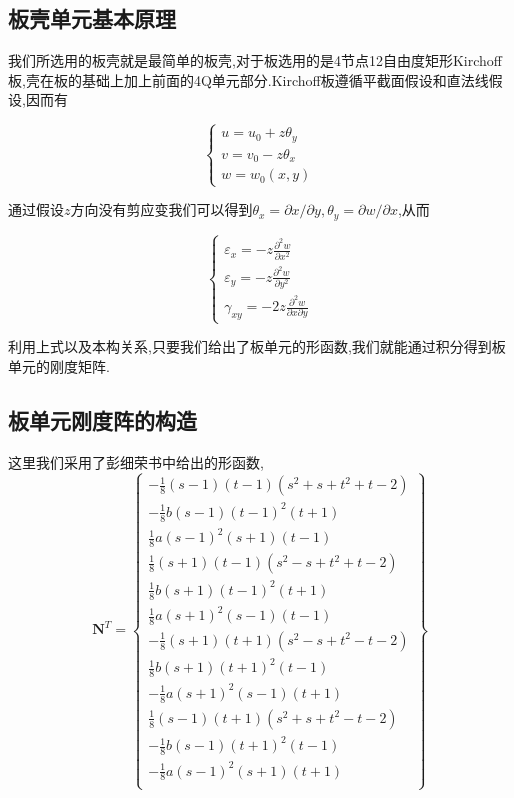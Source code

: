 
\subsection{板壳单元基本原理}
我们所选用的板壳就是最简单的板壳,对于板选用的是4节点12自由度矩形Kirchoff板,壳在板的基础上加上前面的4Q单元部分.Kirchoff板遵循平截面假设和直法线假设,因而有

\[
\left\{ \begin{gathered}
u=u_0+z\theta_y \\
v=v_0-z\theta_x \\
w=w_0(x,y)
\end{gathered} \right.
\]

通过假设$z$方向没有剪应变我们可以得到$\theta_x=\partial x/\partial y, \theta_y=\partial w/\partial x$,从而

\[
\left\{ \begin{gathered}
\varepsilon_x = -z\frac{\partial^2 w}{\partial x^2} \\
\varepsilon_y = -z\frac{\partial^2 w}{\partial y^2} \\
\gamma_{xy} = -2z\frac{\partial^2 w}{\partial x \partial y}
\end{gathered} \right.
\]
\par 利用上式以及本构关系,只要我们给出了板单元的形函数,我们就能通过积分得到板单元的刚度矩阵.
\subsection{板单元刚度阵的构造}
\par 这里我们采用了彭细荣书中给出的形函数,
\[ \mathbf{N}^T=\left\{
\begin{array}{c}
-\frac{1}{8}(s-1)(t-1)(s^2+s+t^2+t-2)\\ -\frac{1}{8}b(s-1)(t-1)^2(t+1)\\ \frac{1}{8}a(s-1)^2(s+1)(t-1) \\
\frac{1}{8}(s+1)(t-1)(s^2-s+t^2+t-2) \\ \frac{1}{8}b(s+1)(t-1)^2(t+1) \\ \frac{1}{8}a(s+1)^2(s-1)(t-1) \\
-\frac{1}{8}(s+1)(t+1)(s^2-s+t^2-t-2)\\ \frac{1}{8}b(s+1)(t+1)^2(t-1) \\ -\frac{1}{8}a(s+1)^2(s-1)(t+1) \\
\frac{1}{8}(s-1)(t+1)(s^2+s+t^2-t-2) \\ -\frac{1}{8}b(s-1)(t+1)^2(t-1) \\ -\frac{1}{8}a(s-1)^2(s+1)(t+1) \\
\end{array} \right\} \]

